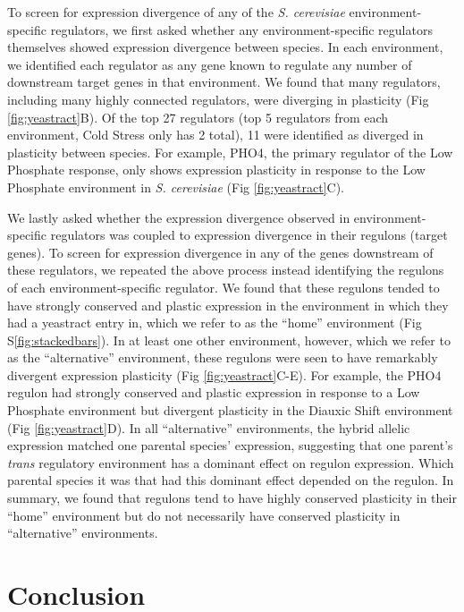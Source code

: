 To screen for expression divergence of any of the \textit{S. cerevisiae} environment-specific regulators, we first asked whether any environment-specific regulators themselves showed expression divergence between species. In each environment, we identified each regulator as any gene known to regulate any number of downstream target genes in that environment. We found that many regulators, including many highly connected regulators, were diverging in plasticity (Fig \ref{fig:yeastract}B). Of the top 27 regulators (top 5 regulators from each environment, Cold Stress only has 2 total), 11 were identified as diverged in plasticity between species. For example, PHO4, the primary regulator of the Low Phosphate response, only shows expression plasticity in response to the Low Phosphate environment in \textit{S. cerevisiae} (Fig \ref{fig:yeastract}C).

We lastly asked whether the expression divergence observed in environment-specific regulators was coupled to expression divergence in their regulons (target genes). To screen for expression divergence in any of the genes downstream of these regulators, we repeated the above process instead identifying the regulons of each environment-specific regulator. We found that these regulons tended to have strongly conserved and plastic expression in the environment in which they had a yeastract entry in, which we refer to as the “home” environment (Fig S\ref{fig:stackedbars}). In at least one other environment, however, which we refer to as the “alternative” environment, these regulons were seen to have remarkably divergent expression plasticity (Fig \ref{fig:yeastract}C-E). For example, the PHO4 regulon had strongly conserved and plastic expression in response to a Low Phosphate environment but divergent plasticity in the Diauxic Shift environment (Fig \ref{fig:yeastract}D). In all ``alternative” environments, the hybrid allelic expression matched one parental species’ expression, suggesting that one parent’s \textit{trans} regulatory environment has a dominant effect on regulon expression. Which parental species it was that had this dominant effect depended on the regulon. In summary, we found that regulons tend to have highly conserved plasticity in their ``home'' environment but do not necessarily have conserved plasticity in ``alternative'' environments.

\section{Conclusion}

